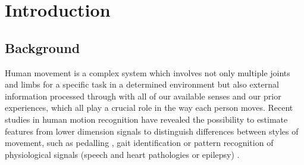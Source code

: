
\chapter{Introduction}  %


\graphicspath{{figs/chapter1/PDF/}}

%


\section{Background}
Human movement is a complex system which involves not only multiple
joints and limbs for a specific task in a determined environment
but also external information processed through with all of our available 
senses and our prior experiences, which all play a crucial role in the way 
each person moves.
Recent studies in human motion recognition have revealed the possibility 
to estimate features from lower dimension signals to distinguish differences 
between styles of movement, such as pedalling 
\citep{Quintana-Duque2012, Quintana-Duque2016}, gait identification 
\citep{sama2013, frank2010} or pattern recognition of physiological signals 
(speech and heart pathologies or epilepsy) \citep{gomezgarcia2014}.

